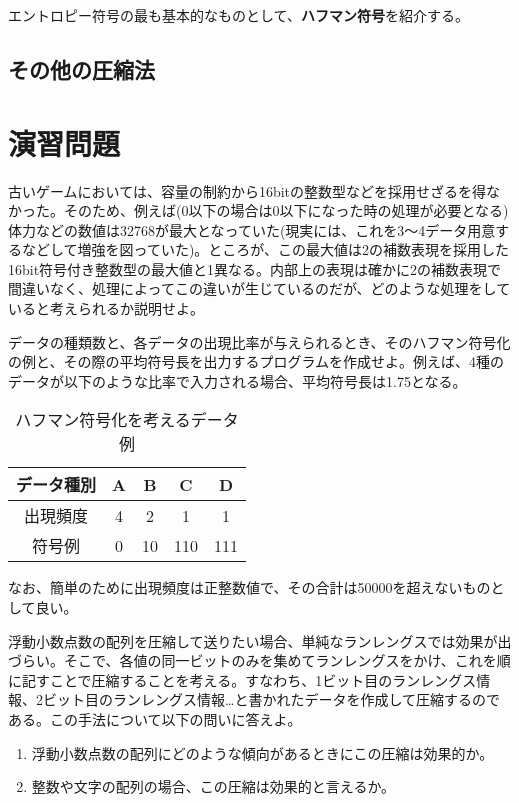 エントロピー符号の最も基本的なものとして、\textbf{ハフマン符号}を紹介する。

\subsection{その他の圧縮法}


\section*{演習問題}
\begin{problems}
\item 古いゲームにおいては、容量の制約から16bitの整数型などを採用せざるを得なかった。そのため、例えば(0以下の場合は0以下になった時の処理が必要となる)体力などの数値は32768が最大となっていた(現実には、これを3〜4データ用意するなどして増強を図っていた)。ところが、この最大値は2の補数表現を採用した16bit符号付き整数型の最大値と1異なる。内部上の表現は確かに2の補数表現で間違いなく、処理によってこの違いが生じているのだが、どのような処理をしていると考えられるか説明せよ。 

\item データの種類数と、各データの出現比率が与えられるとき、そのハフマン符号化の例と、その際の平均符号長を出力するプログラムを作成せよ。例えば、4種のデータが以下のような比率で入力される場合、平均符号長は1.75となる。
\begin{table}
\centering
\caption{ハフマン符号化を考えるデータ例}
\begin{tabular}{|c||c|c|c|c|}\hline
データ種別 & A & B & C & D \\ \hline
出現頻度 & 4 & 2 & 1 & 1 \\ \hline
符号例 & 0 & 10 & 110 & 111 \\ \hline
\end{tabular}
\end{table}
なお、簡単のために出現頻度は正整数値で、その合計は50000を超えないものとして良い。

\item 浮動小数点数の配列を圧縮して送りたい場合、単純なランレングスでは効果が出づらい。そこで、各値の同一ビットのみを集めてランレングスをかけ、これを順に記すことで圧縮することを考える。すなわち、1ビット目のランレングス情報、2ビット目のランレングス情報…と書かれたデータを作成して圧縮するのである。この手法について以下の問いに答えよ。
\begin{enumerate}
\item 浮動小数点数の配列にどのような傾向があるときにこの圧縮は効果的か。
\item 整数や文字の配列の場合、この圧縮は効果的と言えるか。
\end{enumerate}

\end{problems}
